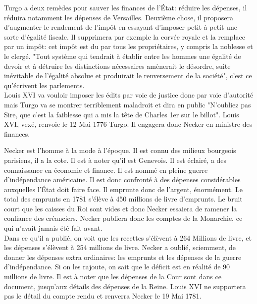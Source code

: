\documentclass[10pt, a4paper, openany]{book}
\begin{document}
Turgo a deux remèdes pour sauver les finances de l'État: réduire les dépenses, il réduira notamment les dépenses de Versailles. Deuxième chose, il proposera d'augmenter le rendement de l'impôt en essayant d'imposer petit à petit une sorte d'égalité fiscale. Il supprimera par exemple la corvée royale et la remplace par un impôt: cet impôt est du par tous les propriétaires, y compris la noblesse et le clergé. "Tout système qui tendrait à établir entre les hommes une égalité de devoir et à détruire les distinctions nécessaires amènerait le désordre, suite inévitable de l'égalité absolue et produirait le renversement de la société", c'est ce qu'écrivent les parlements. \\
Louis XVI va vouloir imposer les édits par voie de justice donc par voie d'autorité mais Turgo va se montrer terriblement maladroit et dira en public "N'oubliez pas Sire, que c'est la faiblesse qui a mis la tête de Charles 1er sur le billot". Louis XVI, vexé, renvoie le 12 Mai 1776 Turgo. Il engagera donc Necker en ministre des finances. 


Necker est l'homme à la mode à l'époque. Il est connu des milieux bourgeois parisiens, il a la cote. Il est à noter qu'il est Genevois. Il est éclairé, a des connaissance en économie et finance. Il est nommé en pleine guerre d'indépendance américaine. Il est donc confronté à des dépenses considérables auxquelles l'État doit faire face. Il emprunte donc de l'argent, énormément. Le total des emprunts en 1781 s'élève à 450 millions de livre d'emprunts. Le bruit court que les caisses du Roi sont vides et donc Necker essaiera de ramener la confiance des créanciers. Necker publiera donc les comptes de la Monarchie, ce qui n'avait jamais été fait avant. \\
Dans ce qu'il a publié, on voit que les recettes s'élèvent à 264 Millions de livre, et les dépenses s'élèvent à 254 millions de livre. Necker a oublié, sciemment, de donner les dépenses extra ordinaires: les emprunts et les dépenses de la guerre d'indépendance. Si on les rajoute, on sait que le déficit est en réalité de 90 millions de livre. Il est à noter que les dépenses de la Cour sont dans ce document, jusqu'aux détails des dépenses de la Reine. Louis XVI ne supportera pas le détail du compte rendu et renverra Necker le 19 Mai 1781. 
\end{document}
